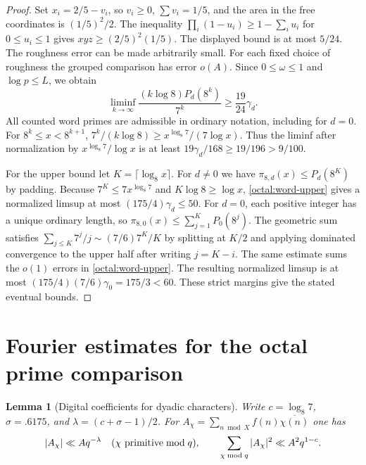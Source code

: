 \documentclass[11pt,a4paper]{article}
\theoremstyle{paperplain}
\newtheorem{lemma}[theorem]{Lemma}
\numberwithin{equation}{section}
\begin{document}
\begin{proof}
Set $x_i=2/5-v_i$, so $v_i\ge0$, $\sum v_i=1/5$, and the area in
the free coordinates is $(1/5)^2/2$. The inequality
$\prod_i(1-u_i)\ge1-\sum_i u_i$ for $0\le u_i\le1$ gives
$xyz\ge(2/5)^2(1/5)$. The displayed bound is at most $5/24$.
The roughness error can be made arbitrarily small. For each fixed
choice of roughness the grouped comparison has error $o(A)$.
Since $0\le\omega\le1$ and $\log p\le L$, we obtain
\begin{equation}\label{octal:word-lower}
 \liminf_{k\to\infty}\frac{(k\log 8)P_d(8^k)}{7^k}
       \ge\frac{19}{24}\gamma_d.
\end{equation}
All counted word primes are admissible in ordinary notation, including
for $d=0$. For $8^k\le x<8^{k+1}$,
$7^k/(k\log8)\ge x^{\log_8 7}/(7\log x)$. Thus the liminf after
normalization by $x^{\log_8 7}/\log x$ is at least
$19\gamma_d/168\ge19/196>9/100$.

For the upper bound let $K=\lceil\log_8 x\rceil$. For $d\ne0$ we have
$\pi_{8,d}(x)\le P_d(8^K)$ by padding. Because $7^K\le7x^{\log_8 7}$ and
$K\log8\ge\log x$, \eqref{octal:word-upper} gives a normalized limsup
at most $(175/4)\gamma_d\le50$. For $d=0$, each positive integer has a
unique ordinary length, so $\pi_{8,0}(x)\le\sum_{j=1}^K P_0(8^j)$.
The geometric sum satisfies $\sum_{j\le K}7^j/j\sim(7/6)7^K/K$
by splitting at $K/2$ and applying dominated convergence to the upper
half after writing $j=K-i$. The same estimate sums the $o(1)$ errors
in \eqref{octal:word-upper}. The resulting normalized limsup is at
most $(175/4)(7/6)\gamma_0=175/3<60$. These strict margins give
the stated eventual bounds.
\end{proof}


\section{Fourier estimates for the octal prime comparison}
\label{sec:octal-fourier}

\begin{lemma}[Digital coefficients for dyadic characters]
\label{octal:semiprime-digital-char}
Write \(c=\log_8 7\), \(\sigma=.6175\), and \(\lambda=(c+\sigma-1)/2\). For
\(A_\chi=\sum_{n\bmod X}f(n)\overline{\chi(n)}\) one has
\begin{equation}\label{octal:semiprime-digital-moments}
 |A_\chi|\ll A q^{-\lambda}\quad(\chi\ {\rm primitive}\bmod q),
 \qquad
 \sum_{\chi\bmod q}|A_\chi|^2\ll A^2q^{1-c}.
\end{equation}
\end{lemma}
\end{document}
